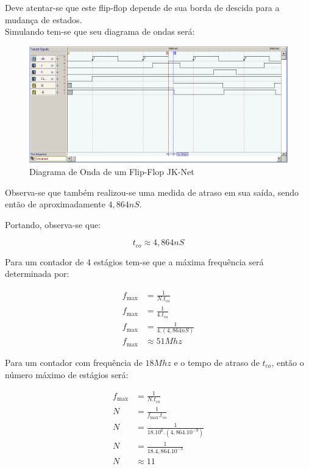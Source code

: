 \documentclass[12pt]{article}
\begin{document}
Deve atentar-se que este flip-flop depende de sua borda de descida para a
mudança de estados.
\\
Simulando tem-se que seu diagrama de ondas será:

\begin{figure}[H]
  \centering
  \includegraphics[width=1.0\textwidth]{Exp09/images/2.1.2.png}
  \caption{Diagrama de Onda de um Flip-Flop JK-Net}\label{fig:2.1.2.png}
\end{figure}
\href{}{}

Observa-se que também realizou-se uma medida de atraso em sua saída, sendo então de aproximadamente $4,864nS$.

Portando, observa-se que:

\begin{equation}
t_{co}\approx4,864nS
\end{equation}

Para um contador de 4 estágios tem-se que a máxima frequência será determinada por:

\begin{align}
f_{\max} &= \frac{1}{N.t_{co}}\\
f_{\max} &= \frac{1}{4.t_{co}}\\
f_{\max} &= \frac{1}{4.(4,864nS)}\\
f_{\max} &\approx51Mhz
\end{align}

Para um contador com frequência de $18Mhz$ e o tempo de atraso de $t_{co}$, então o número máximo de estágios será:

\begin{align}
f_{\max} &= \frac{1}{N.t_{co}}\\
N &= \frac{1}{f_{\max}.t_{co}}\\
N &= \frac{1}{18.10^{6}.(4,864.10^{-9})}\\
N &= \frac{1}{18.4,864.10^{-3}}\\
N &\approx11
\end{align}
\end{document}
